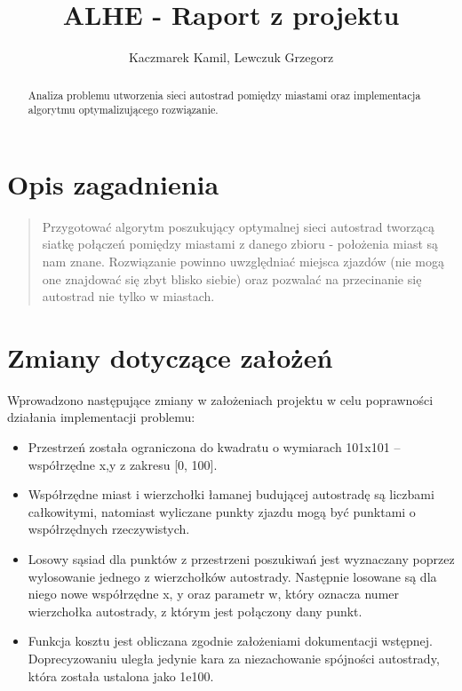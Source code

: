 \documentclass[a4paper]{article}
\title{ALHE - Raport z projektu}
\author{Kaczmarek Kamil, Lewczuk Grzegorz}
\begin{document}
\maketitle

\begin{abstract}
Analiza problemu utworzenia sieci autostrad pomiędzy miastami oraz implementacja algorytmu optymalizującego rozwiązanie.
\end{abstract}

\section{Opis zagadnienia}

\begin{quote}
Przygotować algorytm poszukujący optymalnej sieci autostrad tworzącą siatkę połączeń pomiędzy miastami z danego zbioru - położenia miast są nam znane. Rozwiązanie powinno uwzględniać miejsca zjazdów (nie mogą one znajdować się zbyt blisko siebie) oraz pozwalać na przecinanie się autostrad nie tylko w miastach.
\end{quote}

\section{Zmiany dotyczące założeń}

Wprowadzono następujące zmiany w założeniach projektu w celu poprawności działania implementacji problemu:

\begin{itemize}
\item Przestrzeń została ograniczona do kwadratu o wymiarach 101x101 – współrzędne x,y z zakresu [0, 100].
\item Współrzędne miast i wierzchołki łamanej budującej autostradę są liczbami całkowitymi, natomiast wyliczane punkty zjazdu mogą być punktami o współrzędnych rzeczywistych.
\item Losowy sąsiad dla punktów z przestrzeni poszukiwań jest wyznaczany poprzez wylosowanie jednego z wierzchołków autostrady. Następnie losowane są dla niego nowe współrzędne x, y oraz parametr w, który oznacza numer wierzchołka autostrady, z którym jest połączony dany punkt.
\item Funkcja kosztu jest obliczana zgodnie założeniami dokumentacji wstępnej. Doprecyzowaniu uległa jedynie kara za niezachowanie spójności autostrady, która została ustalona jako 1e100.
\end{itemize}
\end{document}
